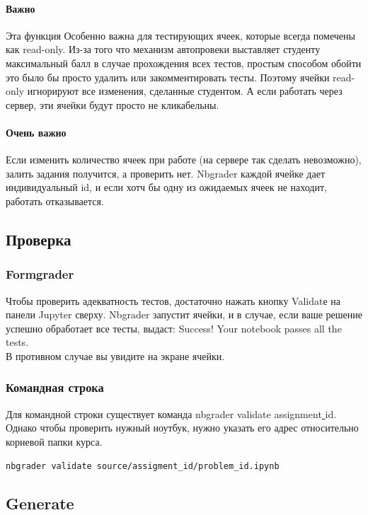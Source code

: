 \documentclass[a4paper,12pt]{article}
\begin{document}
\paragraph{Важно}
Эта функция Особенно важна для тестирующих ячеек, которые всегда помечены как read-only. Из-за того что механизм автопровеки выставляет студенту максимальный балл в случае прохождения всех тестов, простым способом обойти это было бы просто удалить или закомментировать тесты. Поэтому ячейки read-only игнорируют все изменения, сделанные студентом. А если работать через сервер, эти ячейки будут просто не кликабельны.

\paragraph{Очень важно}
Если изменить количество ячеек при работе (на сервере так сделать невозможно), залить задания получится, а проверить нет. Nbgrader каждой ячейке дает индивидуальный id, и если хотч бы одну из ожидаемых ячеек не находит, работать отказывается.
\subsection{Проверка}
\subsubsection{Formgrader}

Чтобы проверить адекватность тестов, достаточно нажать кнопку Validatе на панели Jupyter сверху. Nbgrader запустит ячейки, и в случае, если ваше решение успешно обработает все тесты, выдаст:
\grqq Success! Your notebook passes all the tests.\grqq
\\В противном случае вы увидите на экране \grqq ячейки.
\subsubsection{Командная строка}

Для командной строки существует команда nbgrader validate assignment\underline{ }id. Однако чтобы проверить нужный ноутбук, нужно указать его адрес относительно корневой папки курса.
\begin{verbatim}
nbgrader validate source/assigment_id/problem_id.ipynb
\end{verbatim}
\subsection{Generate}
\end{document}

